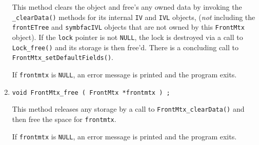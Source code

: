 \begin{enumerate}
This method clears the object and free's any owned data
by invoking the {\tt \_clearData()} methods for its internal
{\tt IV} and {\tt IVL} objects, ({\it not} including
the {\tt frontETree} and {\tt symbfacIVL} objects that are not
owned by this {\tt FrontMtx} object).
If the {\tt lock} pointer is not {\tt NULL}, the lock is destroyed
via a call to {\tt Lock\_free()} and its storage is then
free'd.
There is a concluding call to {\tt FrontMtx\_setDefaultFields()}.
\par {}
If {\tt frontmtx} is {\tt NULL},
an error message is printed and the program exits.
\item
\begin{verbatim}
void FrontMtx_free ( FrontMtx *frontmtx ) ;
\end{verbatim}
This method releases any storage by a call to 
{\tt FrontMtx\_clearData()} and then free the space for {\tt frontmtx}.
\par {}
If {\tt frontmtx} is {\tt NULL},
an error message is printed and the program exits.
\end{enumerate}
\par
